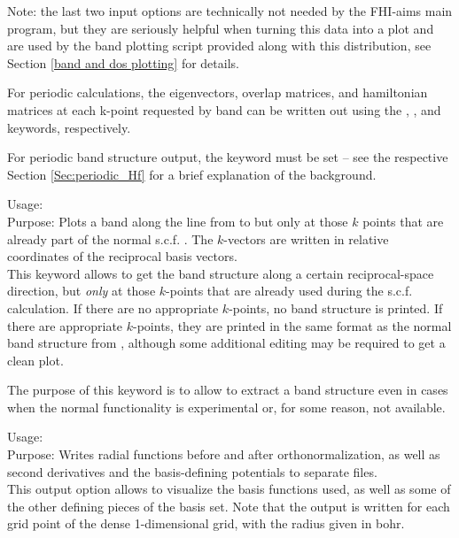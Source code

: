 Note: the last two input options are technically not needed by the
FHI-aims main program, but they are seriously helpful when
turning this data into a plot and are used by the band plotting
script provided along with this distribution, see Section 
\ref{band and dos plotting} for details. 

For periodic calculations, the eigenvectors, overlap matrices, and 
hamiltonian matrices at each k-point requested by 
  {band}
can be written out using the
 , 
 , and
  keywords,
respectively. 

For periodic band structure output, the
 keyword must be set -- see the
respective Section \ref{Sec:periodic_Hf} for a brief explanation of
the background.

{
  Usage:    \\[1.0ex] 
  Purpose: Plots a band along the line from
     to 
   but only at those $k$ points that are
  already part of the normal s.c.f. . The
  $k$-vectors are written in relative 
  coordinates of the reciprocal basis vectors. \\
}
This keyword allows to get the band structure along a certain
reciprocal-space direction, but \emph{only} at those $k$-points that
are already used during the s.c.f. calculation. If there are no
appropriate $k$-points, no band structure is printed. If there are
appropriate $k$-points, they are printed in the same format as the
normal band structure from ,
although some additional editing may be required to get a clean plot. 

The purpose of this keyword is to allow to extract a band structure
even in cases when the normal
 functionality is
experimental or, for some reason, not available. 

{
  \noindent
  Usage:   \\[1.0ex]
  Purpose: Writes radial functions before and after
    orthonormalization, as well as second derivatives and the
    basis-defining potentials to separate files. \\[1.0ex]
}
This output option allows to visualize the basis functions used, as
well as some of the other defining pieces of the basis set. Note
that the output is written for each grid point of the dense
1-dimensional  grid, with the radius
given in bohr.

